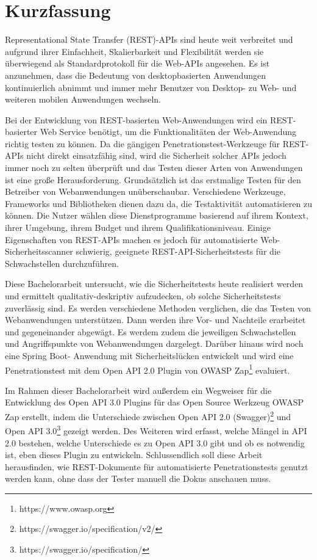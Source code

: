 \chapter{\textbf{Kurzfassung}}

Representational State Transfer (REST)-APIs sind heute weit verbreitet und aufgrund ihrer Einfachheit, Skalierbarkeit und Flexibilität werden sie überwiegend als Standardprotokoll für die Web-APIs angesehen. Es ist anzunehmen, dass die Bedeutung von desktopbasierten Anwendungen kontinuierlich abnimmt und immer mehr Benutzer von Desktop- zu Web- und weiteren mobilen Anwendungen wechseln.

Bei der Entwicklung von REST-basierten Web-Anwendungen wird ein REST-basierter Web Service benötigt, um die Funktionalitäten der Web-Anwendung richtig testen zu können. Da die gängigen Penetrationstest-Werkzeuge für REST-APIs nicht direkt einsatzfähig sind, wird die Sicherheit solcher APIs jedoch immer noch zu selten überprüft und das Testen dieser Arten von Anwendungen ist eine große Herausforderung. Grundsätzlich ist das erstmalige Testen für den Betreiber von Webanwendungen unüberschaubar. Verschiedene Werkzeuge, Frameworks und Bibliotheken dienen dazu da, die Testaktivität automatisieren zu können. Die Nutzer wählen diese Dienstprogramme basierend auf ihrem Kontext, ihrer Umgebung, ihrem Budget und ihrem Qualifikationsniveau. Einige Eigenschaften von REST-APIs machen es jedoch für automatisierte Web-Sicherheitsscanner schwierig, geeignete REST-API-Sicherheitstests für die Schwachstellen durchzuführen.

Diese Bachelorarbeit untersucht, wie die Sicherheitstests heute realisiert werden und ermittelt qualitativ-deskriptiv aufzudecken, ob solche Sicherheitstests zuverlässig sind. Es werden verschiedene Methoden verglichen, die das Testen von Webanwendungen unterstützen. Dann werden ihre Vor- und Nachteile erarbeitet und gegeneinander abgewägt. Es werdem zudem die jeweiligen Schwachstellen und Angriffspunkte von Webanwendungen dargelegt. Darüber hinaus wird noch eine Spring Boot- Anwendung mit Sicherheitslücken entwickelt und wird eine Penetrationstest mit dem Open API 2.0 Plugin von OWASP Zap\footnote{https://www.owasp.org} evaluiert.

Im Rahmen dieser Bachelorarbeit wird außerdem ein Wegweiser für die Entwicklung des Open API 3.0 Plugins für das Open Source Werkzeug OWASP Zap erstellt, indem die Unterschiede zwischen Open API 2.0 (Swagger)\footnote{https://swagger.io/specification/v2/} und Open API 3.0\footnote{https://swagger.io/specification/} gezeigt werden. Des Weiteren wird erfasst, welche Mängel in API 2.0 bestehen, welche Unterschiede es zu Open API 3.0 gibt und ob es notwendig ist, eben dieses Plugin zu entwickeln. Schlussendlich soll diese Arbeit herausfinden, wie REST-Dokumente für automatisierte Penetrationstests genutzt werden kann, ohne dass der Tester
manuell die Dokus anschauen muss.
